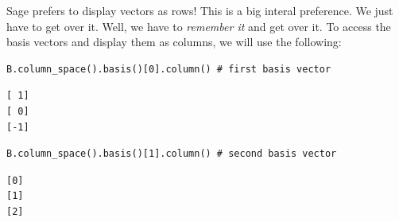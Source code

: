 \documentclass[10pt,]{book}
\theoremstyle{plain}
\numberwithin{equation}{section}
\begin{document}
      Sage prefers to display vectors as rows! This is a big interal preference.
      We just have to get over it. Well, we have to \emph{remember it} and get over it.
      To access the basis vectors and display them as columns,
      we will use the following:
\begin{lstlisting}[style=sageinput]
B.column_space().basis()[0].column() # first basis vector
\end{lstlisting}
\begin{lstlisting}[style=sageoutput]
[ 1]
[ 0]
[-1]
\end{lstlisting}
\begin{lstlisting}[style=sageinput]
B.column_space().basis()[1].column() # second basis vector
\end{lstlisting}
\begin{lstlisting}[style=sageoutput]
[0]
[1]
[2]
\end{lstlisting}
\typeout{************************************************}
\typeout{************************************************}
\end{document}
